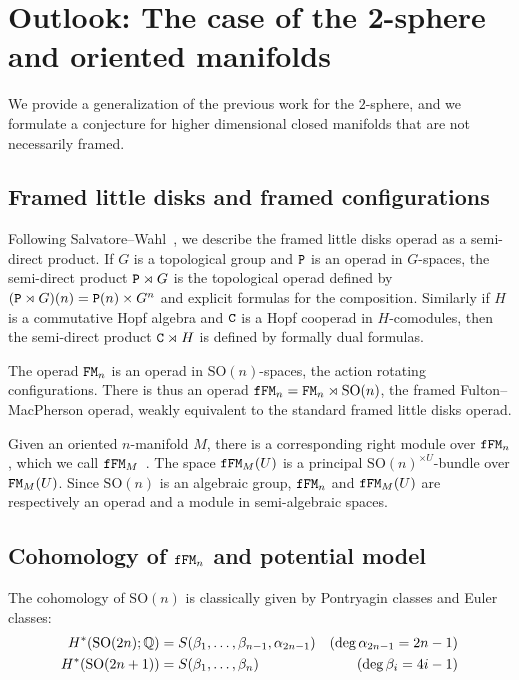 \section{Outlook: The case of the 2-sphere and oriented manifolds}
\label{cnf.sec.oriented-surfaces}

We provide a generalization of the previous work for the $2$-sphere, and we formulate a conjecture for higher dimensional closed manifolds that are not necessarily framed.

\subsection{Framed little disks and framed configurations}
\label{cnf.sec.framed-little-disks}

Following Salvatore--Wahl~\cite[Definition 2.1]{SalvatoreWahl2003}, we describe the framed little disks operad as a semi-direct product.
If $G$ is a topological group and $\mathtt{P}$ is an operad in $G$-spaces, the semi-direct product $\mathtt{P} \rtimes G$ is the topological operad defined by $(\mathtt{P} \rtimes G)(n) = \mathtt{P}(n) \times G^{n}$ and explicit formulas for the composition.
Similarly if $H$ is a commutative Hopf algebra and $\mathtt{C}$ is a Hopf cooperad in $H$-comodules, then the semi-direct product $\mathtt{C} \rtimes H$ is defined by formally dual formulas.

The operad $\mathtt{FM}_{n}$ is an operad in $\mathrm{SO}(n)$-spaces, the action rotating configurations.
There is thus an operad $\mathtt{f}\mathtt{FM}_{n} = \mathtt{FM}_{n} \rtimes \mathrm{SO}(n)$, the framed Fulton--MacPherson operad, weakly equivalent to the standard framed little disks operad.

Given an oriented $n$-manifold $M$, there is a corresponding right module over $\mathtt{f}\mathtt{FM}_{n}$, which we call $\mathtt{f}\mathtt{FM}_{M}$~\cite[Section 2]{Turchin2013}.
The space $\mathtt{f}\mathtt{FM}_{M}(U)$ is a principal $\mathrm{SO}(n)^{\times U}$-bundle over $\mathtt{FM}_{M}(U)$.
Since $\mathrm{SO}(n)$ is an algebraic group, $\mathtt{f}\mathtt{FM}_{n}$ and $\mathtt{f}\mathtt{FM}_{M}(U)$ are respectively an operad and a module in semi-algebraic spaces.

\subsection{Cohomology of \texorpdfstring{$\mathtt{f}\mathtt{FM}_n$}{fFM\_n} and potential model}
\label{cnf.sec.cohom-ffm_n-right}

The cohomology of $\mathrm{SO}(n)$ is classically given by Pontryagin classes and Euler classes:
\begin{align*}
  H^{*}(\mathrm{SO}(2n); \mathbb{Q})
  & = S(\beta_{1}, \dots, \beta_{n-1}, \alpha_{2n-1})
  & (\deg \alpha_{2n-1} = 2n-1)
  \\
  H^{*}(\mathrm{SO}(2n+1))
  & = S(\beta_{1}, \dots, \beta_{n})
  & (\deg \beta_{i} = 4i-1)
\end{align*}

